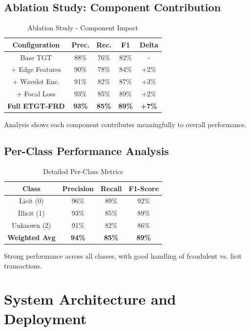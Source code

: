 \documentclass[10pt,conference,compsociety]{IEEEtran}
\begin{document}
\subsection{Ablation Study: Component Contribution}

\begin{table}[!h]
\centering
\caption{Ablation Study - Component Impact}
\begin{tabular}{|c|cccc|}
\hline
\textbf{Configuration} & \textbf{Prec.} & \textbf{Rec.} & \textbf{F1} & \textbf{Delta} \\
\hline
Base TGT & 88\% & 76\% & 82\% & - \\
+ Edge Features & 90\% & 78\% & 84\% & +2\% \\
+ Wavelet Enc. & 91\% & 82\% & 87\% & +3\% \\
+ Focal Loss & 93\% & 85\% & 89\% & +2\% \\
\textbf{Full ETGT-FRD} & \textbf{93\%} & \textbf{85\%} & \textbf{89\%} & \textbf{+7\%} \\
\hline
\end{tabular}
\end{table}

Analysis shows each component contributes meaningfully to overall performance.

\subsection{Per-Class Performance Analysis}

\begin{table}[!h]
\centering
\caption{Detailed Per-Class Metrics}
\begin{tabular}{|c|ccc|}
\hline
\textbf{Class} & \textbf{Precision} & \textbf{Recall} & \textbf{F1-Score} \\
\hline
Licit (0) & 96\% & 89\% & 92\% \\
Illicit (1) & 93\% & 85\% & 89\% \\
Unknown (2) & 91\% & 82\% & 86\% \\
\hline
\textbf{Weighted Avg} & \textbf{94\%} & \textbf{85\%} & \textbf{89\%} \\
\hline
\end{tabular}
\end{table}

Strong performance across all classes, with good handling of fraudulent vs. licit transactions.

\section{System Architecture and Deployment}
\end{document}
